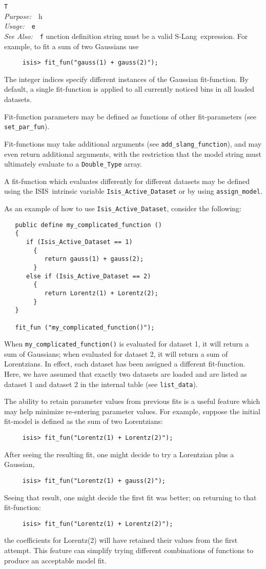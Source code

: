 \documentclass{book}
\makeatletter
\newif\ifpdf
\newcommand{\isisx}{{\sc ISIS~}}
\newcommand{\slang}{{\sc S-Lang}}
\newenvironment{isisfunction}[4]%
{\index{{#1}@{\tt #1}}%
  \ifpdf
  \else
     \addcontentsline{toc}{subsection}{{#1} -- {#2}}
  \fi
  \vbox{
          \vspace*{\baselineskip}
          {\LARGE\tt #1}\vspace*{\baselineskip}\\
          {{\it Purpose:}~~{#2}}\\
          {{\it Usage:}~~{\tt #3}}\\
          {{\it See Also:}~~{\tt #4}}
       }
}%
{ }
\makeatother
\begin{document}
{\begin{isisfunction}
The function definition string must be a valid \slang\
expression.  For example, to fit a sum of two Gaussians
use
\begin{verbatim}
     isis> fit_fun("gauss(1) + gauss(2)");
\end{verbatim}
The integer indices specify different instances of the Gaussian
fit-function.  By default, a single fit-function is applied
to all currently noticed bins in all loaded datasets.

Fit-function parameters may be defined as functions of other
fit-parameters (see \verb|set_par_fun|).

Fit-functions may take additional arguments (see
\verb|add_slang_function|), and may even return additional
arguments, with the restriction that the model string must
ultimately evaluate to a \verb|Double_Type| array.

A fit-function which evaluates differently for different datasets may be
defined using the \isisx intrinsic variable \verb|Isis_Active_Dataset| or by
using \verb|assign_model|.

As an example of how to use \verb|Isis_Active_Dataset|,
consider the following:
\begin{verbatim}
   public define my_complicated_function ()
   {
      if (Isis_Active_Dataset == 1)
        {
           return gauss(1) + gauss(2);
        }
      else if (Isis_Active_Dataset == 2)
        {
           return Lorentz(1) + Lorentz(2);
        }
   }

   fit_fun ("my_complicated_function()");
\end{verbatim}
When \verb|my_complicated_function()| is evaluated for dataset 1,
it will return a sum of Gaussians; when evaluated for dataset 2,
it will return a sum of Lorentzians. In effect, each dataset has
been assigned a different fit-function. Here, we have assumed that
exactly two datasets are loaded and are listed as dataset 1 and
dataset 2 in the internal table (see \verb|list_data|).

The ability to retain parameter values from previous fits is a useful
feature which may help minimize re-entering parameter values.  For example,
suppose the initial fit-model is defined as the sum of two Lorentzians:
\begin{verbatim}
     isis> fit_fun("Lorentz(1) + Lorentz(2)");
\end{verbatim}
After seeing the resulting fit, one might decide to try a Lorentzian
plus a Gaussian,
\begin{verbatim}
     isis> fit_fun("Lorentz(1) + gauss(2)");
\end{verbatim}
Seeing that result, one might decide the first fit was better;
on returning to that fit-function:
\begin{verbatim}
     isis> fit_fun("Lorentz(1) + Lorentz(2)");
\end{verbatim}
the coefficients for Lorentz(2) will have retained their
values from the first attempt.  This feature can simplify trying
different combinations of functions to produce an
acceptable model fit.


\end{isisfunction}}
\end{document}
